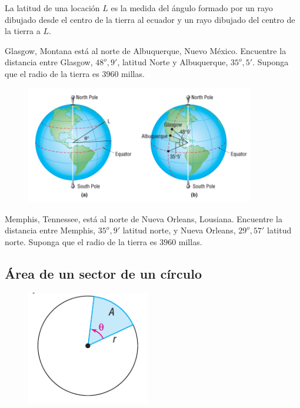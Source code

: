 {}
	\begin{problema}
		La latitud de una locación $L$ es la medida del ángulo formado por un rayo dibujado desde el centro de la tierra al ecuador y un rayo dibujado del centro de la tierra a $L$. 
		
		Glasgow, Montana está al norte de Albuquerque, Nuevo México. Encuentre la distancia entre Glasgow, $48^{o}, 9'$, latitud Norte y Albuquerque, $35^{o}, 5'$. Suponga que el radio de la tierra es $3960$ millas.
	\end{problema}
	

{}
	\begin{figure}
		\centering
		\includegraphics[width=10cm,keepaspectratio=true]{./trig/sull113.png}
		\label{fig:sull6113}
	\end{figure}
	

{}
	\begin{problema}
		Memphis, Tennessee, está al norte de Nueva Orleans, Lousiana. Encuentre la distancia entre Memphis, $35^{o}, 9'$ latitud norte, y Nueva Orleans, $29^{o}, 57'$ latitud norte. Suponga que el radio de la tierra es $3960$ millas. 
	\end{problema}
	

\subsection{Área de un sector de un círculo} 
{}
	\begin{figure}
		\centering
		\includegraphics[height=5cm,keepaspectratio=true]{./trig/sull614.png}
		\label{fig:sull6114}
	\end{figure}

